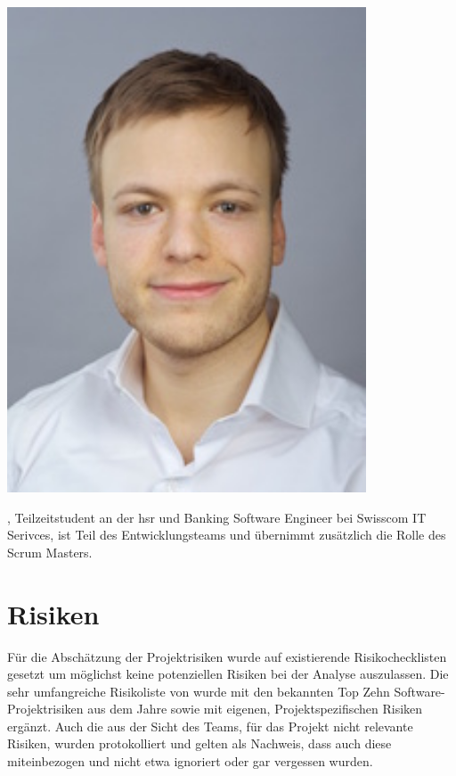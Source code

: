 \section{\fscf}
\begin{minipage}[t]{0.25\textwidth}
	\vspace{0pt}
	\includegraphics[width=0.8\textwidth]{fig/fscala}
\end{minipage}
\begin{minipage}[t]{0.8\textwidth}
	\vspace{0pt}
	\fscf, Teilzeitstudent an der \gls{hsr} und Banking Software Engineer bei Swisscom IT Serivces, ist Teil des Entwicklungsteams und übernimmt zusätzlich die Rolle des Scrum Masters.
\end{minipage}

\chapter{Risiken}\label{sec:risiken}

Für die Abschätzung der Projektrisiken wurde auf existierende \cite{risk} Risikochecklisten gesetzt um möglichst keine potenziellen Risiken bei der Analyse auszulassen. Die sehr umfangreiche Risikoliste von \citeauthor{Wallace:2004:SPR:975817.975819} \cite{Wallace:2004:SPR:975817.975819} wurde mit den bekannten Top Zehn Software-Projektrisiken aus dem Jahre \citeyear{boehm} \cite{boehm} sowie mit eigenen, Projektspezifischen Risiken ergänzt.
Auch die aus der Sicht des Teams, für das Projekt nicht relevante Risiken, wurden protokolliert und gelten als Nachweis, dass auch diese miteinbezogen und nicht etwa ignoriert oder gar vergessen wurden.

